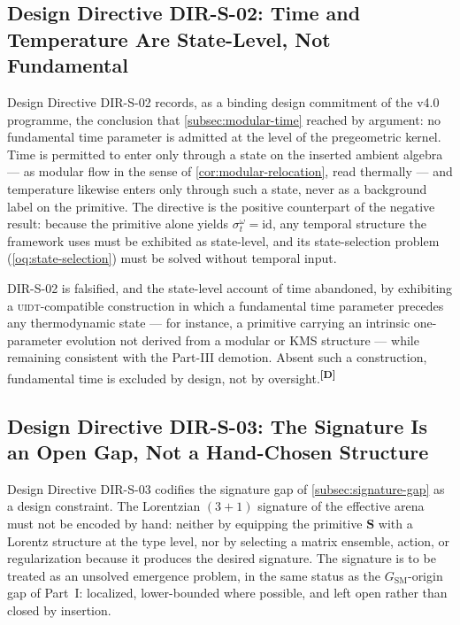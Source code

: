 \documentclass[12pt,a4paper,twoside]{article}
\theoremstyle{plain}
\theoremstyle{definition}
\theoremstyle{remark}
\newcommand{\UIDT}{\textsc{uidt}}
\newcommand{\catmark}[1]{\textsuperscript{\textsf{\textbf{[#1]}}}}
\begin{document}
\subsection{Design Directive DIR-S-02: Time and Temperature Are State-Level, Not Fundamental}
\label{subsec:dir-s-02}

Design Directive DIR-S-02 records, as a binding design commitment of the
v4.0 programme, the conclusion that \cref{subsec:modular-time} reached by
argument: no fundamental time parameter is admitted at the level of the
pregeometric kernel. Time is permitted to enter only through a state on the
inserted ambient algebra --- as modular flow in the sense of
\cref{cor:modular-relocation}, read thermally --- and temperature likewise
enters only through such a state, never as a background label on the
primitive. The directive is the positive counterpart of the negative
result: because the primitive alone yields $\sigma^\omega_t=\mathrm{id}$,
any temporal structure the framework uses must be exhibited as state-level,
and its state-selection problem (\cref{oq:state-selection}) must be solved
without temporal input.

\begin{killswitch}
DIR-S-02 is falsified, and the state-level account of time abandoned, by
exhibiting a \UIDT-compatible construction in which a fundamental time
parameter precedes any thermodynamic state --- for instance, a primitive
carrying an intrinsic one-parameter evolution not derived from a modular or
KMS structure --- while remaining consistent with the Part-III demotion.
Absent such a construction, fundamental time is excluded by design, not by
oversight.\catmark{D}
\end{killswitch}

\subsection{Design Directive DIR-S-03: The Signature Is an Open Gap, Not a Hand-Chosen Structure}
\label{subsec:dir-s-03}

Design Directive DIR-S-03 codifies the signature gap of
\cref{subsec:signature-gap} as a design constraint. The Lorentzian
$(3{+}1)$ signature of the effective arena must not be encoded by hand:
neither by equipping the primitive $\mathbf S$ with a Lorentz structure at
the type level, nor by selecting a matrix ensemble, action, or
regularization because it produces the desired signature. The signature is
to be treated as an unsolved emergence problem, in the same status as the
$G_{\mathrm{SM}}$-origin gap of Part~I: localized, lower-bounded where
possible, and left open rather than closed by insertion.
\end{document}

